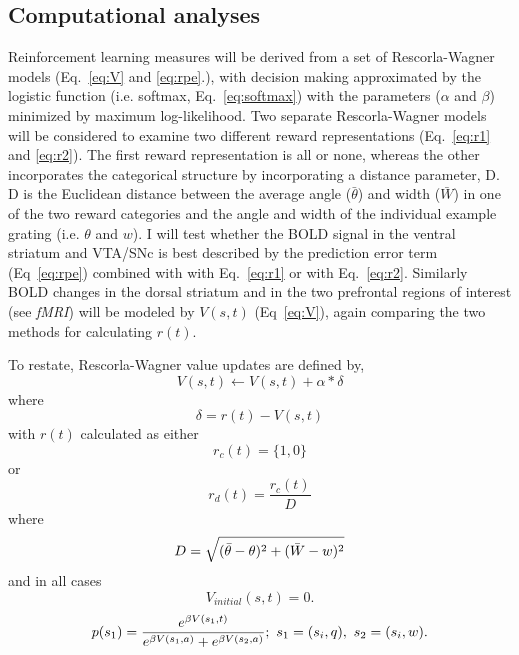 \documentclass[doc,12pt]{apa}        %
\begin{document}
\subsection{Computational analyses} %
\label{sub:Computational}
Reinforcement learning measures will be derived from a set of Rescorla-Wagner models (Eq.~\ref{eq:V} and \ref{eq:rpe}.), with decision making approximated by the logistic function (i.e. softmax, Eq.~\ref{eq:softmax}) with the parameters ($\alpha$ and $\beta$) minimized by maximum log-likelihood.  Two separate Rescorla-Wagner models will be considered to examine two different reward representations (Eq.~\ref{eq:r1} and \ref{eq:r2}).  The first reward representation is all or none, whereas the other incorporates the categorical structure by incorporating a distance parameter, D.  D is the Euclidean distance between the average angle ($\bar{\theta}$) and width ($\bar{W}$) in one of the two reward categories and the angle and width of the individual example grating (i.e. $\theta$ and $w$).   I will test whether the BOLD signal in the ventral striatum and VTA/SNc is best described by the prediction error term (Eq~\ref{eq:rpe}) combined with with Eq.~\ref{eq:r1} or with Eq.~\ref{eq:r2}.    Similarly BOLD changes in the dorsal striatum and in the two prefrontal regions of interest (see \emph{fMRI}) will be modeled by $V(s,t)$ (Eq~\ref{eq:V}), again comparing the two methods for calculating $r(t)$.

To restate, Rescorla-Wagner value updates are defined by,
\begin{equation} \label{eq:V} V(s,t) \leftarrow V(s,t) + \alpha*\delta \end{equation} where 
\begin{equation} \label{eq:rpe} \delta = r(t) - V(s,t) \end{equation}
with $r(t)$ calculated as either
\begin{equation}
	\label{eq:r1}
	r_{c}(t) = \{1,0\}
\end{equation}
or
\begin{equation}
	\label{eq:r2}
    r_{d}(t) = \frac{r_{c}(t)}{D}
\end{equation}
where
\begin{equation}
	\label{eq:D}\\
	D = \sqrt{(\bar{\theta} - \theta)^2 + (\bar{W}-w)^2}
\end{equation}
and in all cases
\begin{equation} \label{eq:V0} V_{initial}(s,t) = 0. \end{equation}
\begin{equation}
	\label{eq:softmax}
	p(s_1) = {e^{\beta V(s_1,t)}\over{e^{\beta V(s_1,a)} + e^{\beta V(s_2,a)}}};\ s_1 = (s_{i},q), \ s_2 = (s_{i}, w).
\end{equation}
\end{document}
